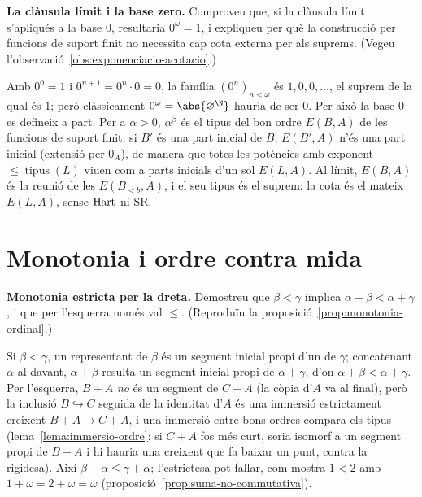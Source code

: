 \begin{exercici}
\textbf{La clàusula límit i la base zero.} Comproveu que, si la clàusula límit s'apliqués a la base \(0\), resultaria \(0^\omega=1\), i expliqueu per què la construcció per funcions de suport finit no necessita cap cota externa per als suprems. (Vegeu l'observació~\ref{obs:exponenciacio-acotacio}.)
\end{exercici}
\begin{solucio}
Amb \(0^0=1\) i \(0^{n+1}=0^n\cdot0=0\), la família \((0^n)_{n<\omega}\) és \(1,0,0,\dots\), el suprem de la qual és \(1\); però clàssicament \(0^\omega=\abs{\varnothing^{\N}}\) hauria de ser \(0\). Per això la base \(0\) es defineix a part. Per a \(\alpha>0\), \(\alpha^\beta\) és el tipus del bon ordre \(E(B,A)\) de les funcions de suport finit; si \(B'\) és una part inicial de \(B\), \(E(B',A)\) n'és una part inicial (extensió per \(0_A\)), de manera que totes les potències amb exponent \(\le\operatorname{tipus}(L)\) viuen com a parts inicials d'un sol \(E(L,A)\). Al límit, \(E(B,A)\) és la reunió de les \(E(B_{<b},A)\), i el seu tipus és el suprem: la cota és el mateix \(E(L,A)\), sense \(\operatorname{Hart}\) ni SR.
\end{solucio}

\section{Monotonia i ordre contra mida}\label{prac:ordre-mida}

\begin{exercici}
\textbf{Monotonia estricta per la dreta.} Demostreu que \(\beta<\gamma\) implica \(\alpha+\beta<\alpha+\gamma\), i que per l'esquerra només val \(\le\). (Reproduïu la proposició~\ref{prop:monotonia-ordinal}.)
\end{exercici}
\begin{solucio}
Si \(\beta<\gamma\), un representant de \(\beta\) és un segment inicial propi d'un de \(\gamma\); concatenant \(\alpha\) al davant, \(\alpha+\beta\) resulta un segment inicial propi de \(\alpha+\gamma\), d'on \(\alpha+\beta<\alpha+\gamma\). Per l'esquerra, \(B+A\) \emph{no} és un segment de \(C+A\) (la còpia d'\(A\) va al final), però la inclusió \(B\hookrightarrow C\) seguida de la identitat d'\(A\) és una immersió estrictament creixent \(B+A\to C+A\), i una immersió entre bons ordres compara els tipus (lema~\ref{lema:immersio-ordre}: si \(C+A\) fos més curt, seria isomorf a un segment propi de \(B+A\) i hi hauria una creixent que fa baixar un punt, contra la rigidesa). Així \(\beta+\alpha\le\gamma+\alpha\); l'estrictesa pot fallar, com mostra \(1<2\) amb \(1+\omega=2+\omega=\omega\) (proposició~\ref{prop:suma-no-commutativa}).
\end{solucio}

